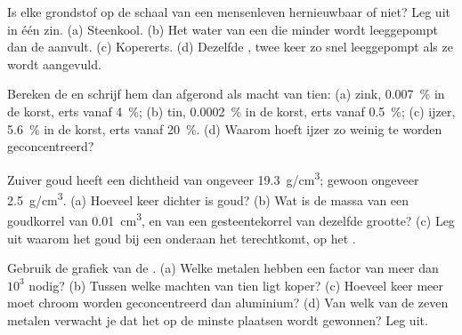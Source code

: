 \begin{exercise}[$\star$]\label{exo:g9:earth-resources:4}
Is elke grondstof op de schaal van een mensenleven hernieuwbaar of niet?
Leg uit in één zin. (a) Steenkool. (b) Het water van een 
die minder wordt leeggepompt dan de  aanvult. (c) Kopererts.
(d) Dezelfde , twee keer zo snel leeggepompt als ze
wordt aangevuld.
\end{exercise}

\begin{exercise}[$\star\star$]\label{exo:g9:earth-resources:5}
Bereken de  en schrijf hem dan afgerond als macht van
tien: (a) zink, \qty{0.007}{\%} in de korst, erts vanaf \qty{4}{\%};
(b) tin, \qty{0.0002}{\%} in de korst, erts vanaf \qty{0.5}{\%};
(c) ijzer, \qty{5.6}{\%} in de korst, erts vanaf \qty{20}{\%}. (d) Waarom
hoeft ijzer zo weinig te worden geconcentreerd?
\end{exercise}

\begin{exercise}[$\star\star$]\label{exo:g9:earth-resources:6}
Zuiver goud heeft een dichtheid van ongeveer \qty{19.3}{g/cm^3}; gewoon
 ongeveer \qty{2.5}{g/cm^3}. (a) Hoeveel keer dichter is goud?
(b) Wat is de massa van een goudkorrel van \qty{0.01}{cm^3}, en van een
gesteentekorrel van dezelfde grootte? (c) Leg uit waarom het goud bij een
 onderaan het  terechtkomt, op het .
\end{exercise}

\begin{exercise}[$\star\star$]\label{exo:g9:earth-resources:7}
Gebruik de grafiek van de . (a) Welke metalen hebben
een factor van meer dan $10^3$ nodig? (b) Tussen welke machten van tien
ligt koper? (c) Hoeveel keer meer moet chroom worden geconcentreerd dan
aluminium? (d) Van welk van de zeven metalen verwacht je dat het op de
minste plaatsen wordt gewonnen? Leg uit.
\end{exercise}

